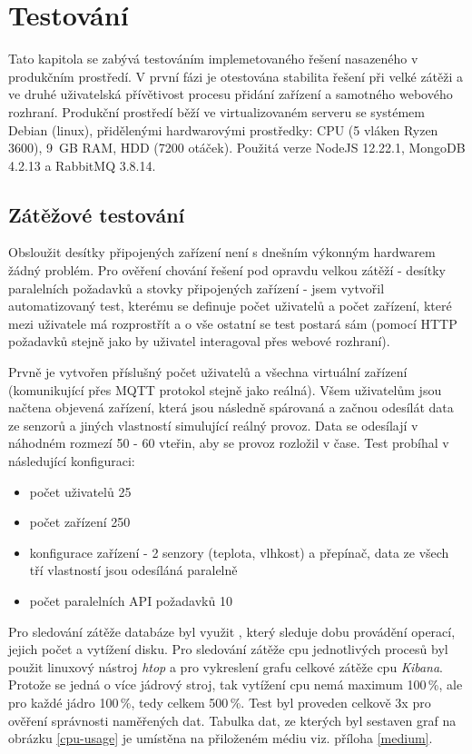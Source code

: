 \chapter{Testování}
Tato kapitola se zabývá testováním implemetovaného řešení nasazeného v produkčním prostředí. V první fázi je otestována stabilita řešení při velké zátěži a ve druhé uživatelská přívětivost procesu přidání zařízení a samotného webového rozhraní. Produkční prostředí běží ve virtualizovaném serveru se systémem Debian (linux), přidělenými hardwarovými prostředky: CPU (5 vláken Ryzen 3600), 9~GB RAM, HDD (7200 otáček). Použitá verze NodeJS 12.22.1, MongoDB 4.2.13 a RabbitMQ 3.8.14.

\section{Zátěžové testování}
Obsloužit desítky připojených zařízení není s dnešním výkonným hardwarem žádný problém. Pro ověření chování řešení pod opravdu velkou zátěží - desítky paralelních požadavků a stovky připojených zařízení - jsem vytvořil automatizovaný test, kterému se definuje počet uživatelů a počet zařízení, které mezi uživatele má rozprostřít a o vše ostatní se test postará sám (pomocí HTTP požadavků stejně jako by uživatel interagoval přes webové rozhraní).

Prvně je vytvořen příslušný počet uživatelů a všechna virtuální zařízení (komunikující přes MQTT protokol stejně jako reálná). Všem uživatelům jsou načtena objevená zařízení, která jsou následně spárovaná a začnou odesílát data ze senzorů a jiných vlastností simulující reálný provoz. Data se odesílají v náhodném rozmezí 50 - 60 vteřin, aby se provoz rozložil v čase. Test probíhal v následující konfiguraci:
\begin{itemize}
    \item počet uživatelů 25
    \item počet zařízení 250
    \item konfigurace zařízení - 2 senzory (teplota, vlhkost) a přepínač, data ze všech tří vlastností jsou odesíláná paralelně
    \item počet paralelních API požadavků 10
\end{itemize}
Pro sledování zátěže databáze byl využit  \cite{free-monitoring}, který sleduje dobu provádění operací, jejich počet a vytížení disku. Pro sledování zátěže cpu jednotlivých procesů byl použit linuxový nástroj \textit{htop} a pro vykreslení grafu celkové zátěže cpu \textit{Kibana}. Protože se jedná o více jádrový stroj, tak vytížení cpu nemá maximum 100\,\%, ale pro každé jádro 100\,\%, tedy celkem 500\,\%. Test byl proveden celkově 3x pro ověření správnosti naměřených dat. Tabulka dat, ze kterých byl sestaven graf na obrázku \ref{cpu-usage} je umístěna na přiloženém médiu viz. příloha \ref{medium}.

